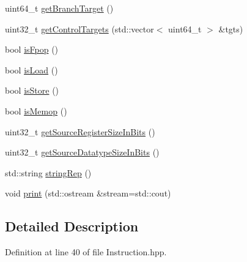 \begin{DoxyCompactItemize}
uint64\-\_\-t \hyperlink{class_e_p_a_x_1_1_instruction_a8571ae62b9e8a2a24b6f063eff68902e}{get\-Branch\-Target} ()
\item 
uint32\-\_\-t \hyperlink{class_e_p_a_x_1_1_instruction_ab534268df34959940b11e31eb0473f00}{get\-Control\-Targets} (std\-::vector$<$ uint64\-\_\-t $>$ \&tgts)
\item 
bool \hyperlink{class_e_p_a_x_1_1_instruction_a6c4f718fb43f948b0ddfea2e79bee122}{is\-Fpop} ()
\item 
bool \hyperlink{class_e_p_a_x_1_1_instruction_a40207280f01d8a7f28527f6f85381b79}{is\-Load} ()
\item 
bool \hyperlink{class_e_p_a_x_1_1_instruction_a46a6b8fbab40247d8e9ff7c3f914b369}{is\-Store} ()
\item 
bool \hyperlink{class_e_p_a_x_1_1_instruction_a25c8f4fa7ad6296684fad26860f5719b}{is\-Memop} ()
\item 
uint32\-\_\-t \hyperlink{class_e_p_a_x_1_1_instruction_a971eef056f7df199d3ee902e33ce3ac1}{get\-Source\-Register\-Size\-In\-Bits} ()
\item 
uint32\-\_\-t \hyperlink{class_e_p_a_x_1_1_instruction_a863b17b7a11dd35b38ed72ba12e1a4a2}{get\-Source\-Datatype\-Size\-In\-Bits} ()
\item 
std\-::string \hyperlink{class_e_p_a_x_1_1_instruction_aa1e4422b1b5468ef2a6bc7ced4f93fc3}{string\-Rep} ()
\item 
void \hyperlink{class_e_p_a_x_1_1_instruction_aad46a5ae82142ed736ced45e9bf7d775}{print} (std\-::ostream \&stream=std\-::cout)
\end{DoxyCompactItemize}


\subsection{\-Detailed \-Description}


\-Definition at line 40 of file \-Instruction.\-hpp.



